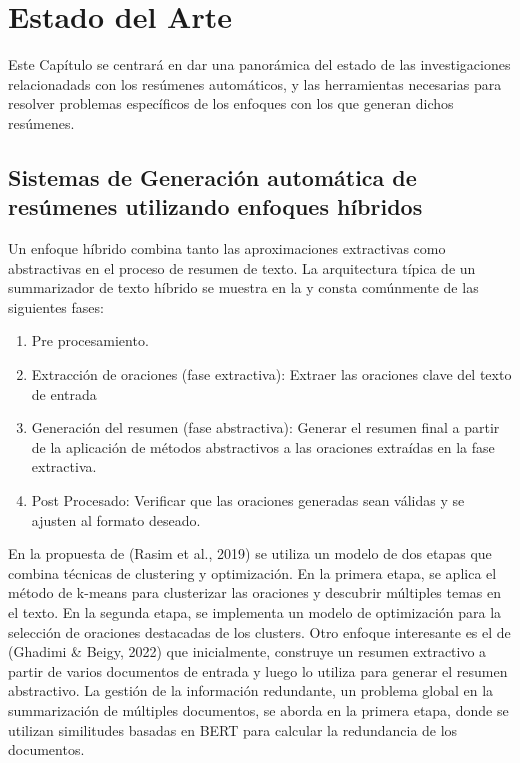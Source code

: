\chapter{Estado del Arte}\label{chapter:state-of-the-art}
    Este Capítulo se centrará en dar una panorámica del estado de las investigaciones relacionadads con los resúmenes automáticos, y las herramientas necesarias para resolver problemas específicos de los enfoques con los que generan dichos resúmenes.

\section{Sistemas de Generación automática de resúmenes utilizando enfoques híbridos}

Un enfoque híbrido combina tanto las aproximaciones extractivas como abstractivas en el proceso de resumen de texto. La arquitectura típica de un summarizador de texto híbrido se muestra en la y consta comúnmente de las siguientes fases:



\begin{enumerate}
    \item Pre procesamiento.
    \item Extracción de oraciones (fase extractiva): Extraer las oraciones clave del texto de entrada\cite[(Wang et al., 2017)]{Wang}
    \item Generación del resumen (fase abstractiva): Generar el resumen final a partir de la aplicación de métodos abstractivos a las oraciones extraídas en la fase extractiva.
    \item Post Procesado: Verificar que las oraciones generadas sean válidas y se ajusten al formato deseado.
\end{enumerate}


En la propuesta de (Rasim et al., 2019)\cite{cosum} se utiliza un modelo de dos etapas que combina técnicas de clustering y optimización. En la primera etapa, se aplica el método de k-means para clusterizar las oraciones y descubrir múltiples temas en el texto. En la segunda etapa, se implementa un modelo de optimización para la selección de oraciones destacadas de los clusters. Otro enfoque interesante es el de (Ghadimi \& Beigy, 2022)\cite{hybrid-llm} que inicialmente, construye un resumen extractivo a partir de varios documentos de entrada y luego lo utiliza para generar el resumen abstractivo. La gestión de la información redundante, un problema global en la summarización de múltiples documentos, se aborda en la primera etapa, donde se utilizan similitudes basadas en BERT\cite{BERT} para calcular la redundancia de los documentos.

